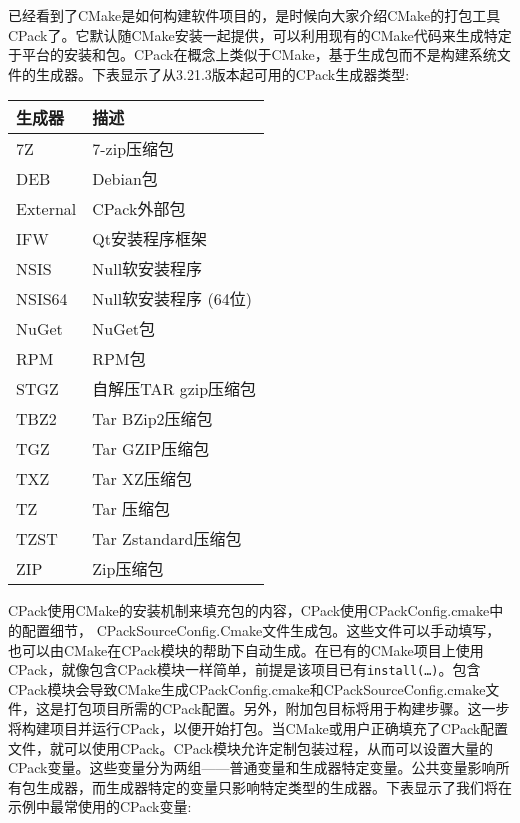 已经看到了CMake是如何构建软件项目的，是时候向大家介绍CMake的打包工具CPack了。它默认随CMake安装一起提供，可以利用现有的CMake代码来生成特定于平台的安装和包。CPack在概念上类似于CMake，基于生成包而不是构建系统文件的生成器。下表显示了从3.21.3版本起可用的CPack生成器类型:

\begin{table}[H]
	\centering
	\begin{tabular}{|l|l|}
		\hline
		\textbf{生成器}    & \textbf{描述}             \\ \hline
		7Z                 & 7-zip压缩包                    \\ \hline
		DEB                & Debian包                   \\ \hline
		External           & CPack外部包           \\ \hline
		IFW                & Qt安装程序框架           \\ \hline
		NSIS               & Null软安装程序              \\ \hline
		NSIS64             & Null软安装程序 (64位)      \\ \hline
		NuGet              & NuGet包                   \\ \hline
		RPM                & RPM包                      \\ \hline
		STGZ               & 自解压TAR gzip压缩包 \\ \hline
		TBZ2               & Tar BZip2压缩包                \\ \hline
		TGZ                & Tar GZIP压缩包                 \\ \hline
		TXZ                & Tar XZ压缩包                   \\ \hline
		TZ                 & Tar 压缩包             \\ \hline
		TZST               & Tar Zstandard压缩包           \\ \hline
		ZIP                & Zip压缩包                      \\ \hline
	\end{tabular}
\end{table}

CPack使用CMake的安装机制来填充包的内容，CPack使用CPackConfig.cmake中的配置细节， CPackSourceConfig.Cmake文件生成包。这些文件可以手动填写，也可以由CMake在CPack模块的帮助下自动生成。在已有的CMake项目上使用CPack，就像包含CPack模块一样简单，前提是该项目已有\texttt{install(…)}。包含CPack模块会导致CMake生成CPackConfig.cmake和CPackSourceConfig.cmake文件，这是打包项目所需的CPack配置。另外，附加包目标将用于构建步骤。这一步将构建项目并运行CPack，以便开始打包。当CMake或用户正确填充了CPack配置文件，就可以使用CPack。CPack模块允许定制包装过程，从而可以设置大量的CPack变量。这些变量分为两组——普通变量和生成器特定变量。公共变量影响所有包生成器，而生成器特定的变量只影响特定类型的生成器。下表显示了我们将在示例中最常使用的CPack变量:

